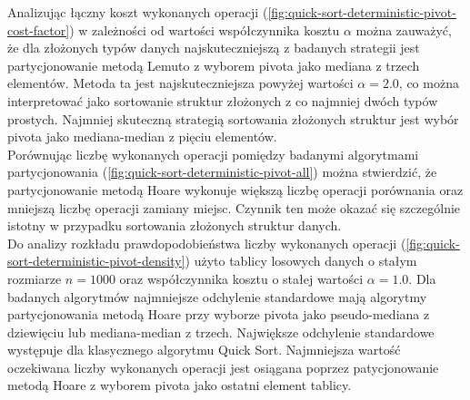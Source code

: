 Analizując łączny koszt wykonanych operacji (\ref{fig:quick-sort-deterministic-pivot-cost-factor}) w zależności od wartości współczynnika kosztu $\alpha$ można zauważyć, że dla złożonych typów danych najskuteczniejszą z badanych strategii jest partycjonowanie metodą Lemuto z wyborem pivota jako mediana z trzech elementów. Metoda ta jest najskuteczniejsza powyżej wartości $\alpha = 2.0$, co można interpretować jako sortowanie struktur złożonych z co najmniej dwóch typów prostych. Najmniej skuteczną strategią sortowania złożonych struktur jest wybór pivota jako mediana-median z pięciu elementów.\\

Porównując liczbę wykonanych operacji pomiędzy badanymi algorytmami partycjonowania (\ref{fig:quick-sort-deterministic-pivot-all}) można stwierdzić, że partycjonowanie metodą Hoare wykonuje większą liczbę operacji porównania oraz mniejszą liczbę operacji zamiany miejsc. Czynnik ten może okazać się szczególnie istotny w przypadku sortowania złożonych struktur danych.\\
 
Do analizy rozkładu prawdopodobieństwa liczby wykonanych operacji (\ref{fig:quick-sort-deterministic-pivot-density}) użyto tablicy losowych danych o stałym rozmiarze $n = 1000$ oraz współczynnika kosztu o stałej wartości $\alpha = 1.0$. Dla badanych algorytmów najmniejsze odchylenie standardowe mają algorytmy partycjonowania metodą Hoare przy wyborze pivota jako pseudo-mediana z dziewięciu lub mediana-median z trzech. Największe odchylenie standardowe występuje dla klasycznego algorytmu Quick Sort. Najmniejsza wartość oczekiwana liczby wykonanych operacji jest osiągana poprzez patycjonowanie metodą Hoare z wyborem pivota jako ostatni element tablicy.


\begin{figure}[]
	\centering
	
	\caption[]{}
	\label{fig:quick-sort-deterministic-pivot-random}
\end{figure}

\begin{figure}[]
	\centering
	
	\caption[]{}
	\label{fig:quick-sort-deterministic-pivot-reversed}
\end{figure}

